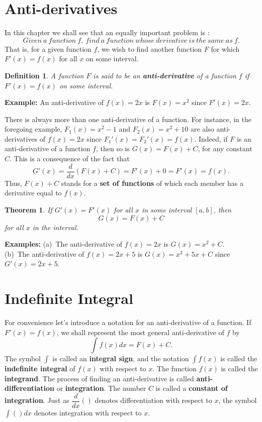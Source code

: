 \documentclass[titlepage,a4paper,12pt]{report}
\newtheorem{definition}{Definition}[section]
\newtheorem{theorem}{Theorem}[section]
\begin{document}
\section{Anti-derivatives}
In this chapter we shall see that an equally important problem is :
\begin{equation*}
Given~ a~ function~ f,~ find~ a~ function~ whose~ derivative~ is~ the~ same~ as~ f.
\end{equation*}
That is, for a given function $f$, we wish to find another function $F$ for which $F'(x)=f(x)$ for all $x$ on some interval.
\begin{definition}
A function $F$ is said to be an \textbf{anti-derivative} of a function $f$ if $F'(x)=f(x)$ on some interval.
\end{definition}

\noindent \textbf{Example:} An anti-derivative of $f(x)=2x$ is $F(x)=x^2$ since $F'(x)=2x$.

\noindent There is always more than one anti-derivative of a function. For instance, in the foregoing example, $F_1(x)=x^2-1$ and $F_2(x)=x^2+10$ are also anti-derivatives of $f(x)=2x$ since $F_1'(x)=F_2'(x)=f(x)$. Indeed, if $F$ is an anti-derivative of a function $f$, then so is $G(x)=F(x)+C$, for any constant $C$. This is a consequence of the fact that 
\begin{equation*}
G'(x)=\dfrac{d}{dx}(F(x)+C)=F'(x)+0=F'(x)=f(x).
\end{equation*}
Thus, $F(x)+C$ stands for a \textbf{set of functions} of which each member has a derivative equal to $f(x)$.
\begin{theorem}
If $G'(x)=F'(x)$ for all $x$ in some interval $[a,b]$, then 
\begin{equation*}
G(x)=F(x)+C
\end{equation*}
for all $x$ in the interval.
\end{theorem}

\noindent \textbf{Examples:} (a)\, The anti-derivative of $f(x)=2x$ is $G(x)=x^2+C$.\\
(b)\, The anti-derivative of $f(x)=2x+5$ is $G(x)=x^2+5x+C$ since $G'(x)=2x+5$.

\section{Indefinite Integral }
For convenience let's introduce a notation for an anti-derivative of a function. If $F'(x)=f(x)$, we shall represent the most general anti-derivative of $f$ by 
\begin{equation*}
\int f(x) dx =F(x) +C.
\end{equation*}
The symbol $\displaystyle \int$ is called an \textbf{integral sign}, and the notation $\displaystyle \int f(x)$ is called the \textbf{indefinite integral} of $f(x)$ with respect to $x$. The function $f(x)$ is called the \textbf{integrand}. The process of finding an anti-derivative is called \textbf{anti-differentiation} or \textbf{integration}. The number $C$ is called a \textbf{constant of integration}. Just as $\dfrac{d}{dx} ()$ denotes differentiation with respect to $x$, the symbol $\displaystyle \int ()dx$ denotes integration with respect to $x$.
\end{document}

